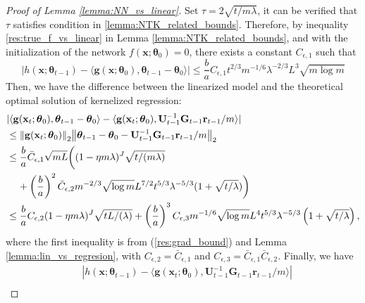 \begin{proof}[Proof of Lemma \ref{lemma:NN_vs_linear}]
Set $\tau=2\sqrt{t/m\lambda}$, it can be verified that $\tau$ satisfies condition in \ref{lemma:NTK_related_bounds}. Therefore,  by inequality \ref{res:true_f_vs_linear} in Lemma \ref{lemma:NTK_related_bounds}, and with the initialization of the network $f(\mathbf{x};\boldsymbol{\theta}_0) = 0$, there exists a constant $C_{\epsilon,1}$ such that
\[\left \lvert h(\mathbf{x}; \boldsymbol{\theta}_{t-1}) - \langle \mathbf{g}(\mathbf{x}; \boldsymbol{\theta}_0), \boldsymbol{\theta}_{t-1} - \boldsymbol{\theta}_0 \rangle  \right\rvert  \leq  \frac{b}{a} C_{\epsilon,1}   t^{2/3}m^{-1/6}\lambda^{-2/3} L^{3}\sqrt{m\log m} \]
Then, we have the difference between the linearized model and the theoretical optimal solution of kernelized regression:
\begin{equation*}
    \begin{split}
        & \lvert \langle\mathbf{g}(\mathbf{x}_{t};\boldsymbol{\theta}_{0}),\boldsymbol{\theta}_{t-1}-\boldsymbol{\theta}_{0}\rangle-\langle\mathbf{g}(\mathbf{x}_{t};\boldsymbol{\theta}_{0}),\mathbf{U}_{t-1}^{-1}\mathbf{G}_{t-1}\mathbf{r}_{t-1}/m\rangle \rvert \\
        & \leq \norm{\mathbf{g}(\mathbf{x}_t;\boldsymbol{\theta}_0)}_2 \norm{\boldsymbol{\theta}_{t-1}-\boldsymbol{\theta}_{0} - \mathbf{U}_{t-1}^{-1}\mathbf{G}_{t-1}\mathbf{r}_{t-1}/m}_2\\
        & \le \frac{b}{a} \Bar{C}_{\epsilon,1} \sqrt{mL} \bigg((1-\eta m\lambda)^{J}\sqrt{t/(m\lambda)} \\ & \;\;\;\; +\left(\frac{b}{a}\right)^2 \Bar{C}_{\epsilon, 2}m^{-2/3}\sqrt{\log m}L^{7/2}t^{5/3}\lambda^{-5/3}(1+\sqrt{t/\lambda}) \bigg)\\
        & \le \frac{b}{a} C_{\epsilon,2} (1-\eta m\lambda)^{J} \sqrt{tL/(\lambda)} +  \left(\frac{b}{a} \right)^3 C_{\epsilon,3} m^{-1/6} \sqrt{\log m} L^4 t^{5/3} \lambda ^{-5/3} \left(1 + \sqrt{t/\lambda} \right),\\
    \end{split}
\end{equation*}
where the first inequality is from (\ref{res:grad_bound}) and Lemma \ref{lemma:lin_vs_regresion}, with $C_{\epsilon,2} = \bar C_{\epsilon,1}$ and  $C_{\epsilon,3} = \bar C_{\epsilon,1} \bar C_{\epsilon,2}$.
Finally, we have 
\begin{equation*}
    \begin{split}
        & \left \lvert h(\mathbf{x}; \boldsymbol{\theta}_{t-1}) - \langle \mathbf{g}(\mathbf{x}_{t};\boldsymbol{\theta}_{0}),\mathbf{U}_{t-1}^{-1}\mathbf{G}_{t-1}\mathbf{r}_{t-1}/m\rangle \right\rvert \\

\end{split}
\end{equation*}
\end{proof}
